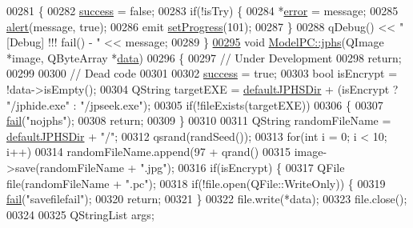 \begin{DoxyCode}
00281 \{
00282     \hyperlink{class_model_p_c_a945ffbbc44a832b953c191debd448f4c}{success} = \textcolor{keyword}{false};
00283     \textcolor{keywordflow}{if}(!isTry) \{
00284         *\hyperlink{class_model_p_c_a4e5a9c0ca1f06fe5bc478b6bf248c37c}{error} = message;
00285         \hyperlink{class_model_p_c_a9079a101d83672aa48fd2dbac797de40}{alert}(message, \textcolor{keyword}{true});
00286         emit \hyperlink{class_model_p_c_afdcd80f0ed5062e145a71f09b0897547}{setProgress}(101);
00287     \}
00288     qDebug() << \textcolor{stringliteral}{"[Debug] !!! fail() - "} << message;
00289 \}
\hypertarget{modelpc_8cpp_source_l00295}{}\hyperlink{class_model_p_c_a8bee0255c09449868c7e6097afaaf0cd}{00295} \textcolor{keywordtype}{void} \hyperlink{class_model_p_c_a8bee0255c09449868c7e6097afaaf0cd}{ModelPC::jphs}(QImage *image, QByteArray *\hyperlink{namespace_errors_dict_setup_adf4c30d205d29df7343e26f7c62b0685}{data})
00296 \{
00297     \textcolor{comment}{// Under Development}
00298     \textcolor{keywordflow}{return};
00299 
00300     \textcolor{comment}{// Dead code}
00301 
00302     \hyperlink{class_model_p_c_a945ffbbc44a832b953c191debd448f4c}{success} = \textcolor{keyword}{true};
00303     \textcolor{keywordtype}{bool} isEncrypt = !data->isEmpty();
00304     QString targetEXE = \hyperlink{class_model_p_c_abd038306f14f22fb885a1697c96d6335}{defaultJPHSDir} + (isEncrypt ? \textcolor{stringliteral}{"/jphide.exe"} : \textcolor{stringliteral}{"/jpseek.exe"});
00305     \textcolor{keywordflow}{if}(!fileExists(targetEXE))
00306     \{
00307         \hyperlink{class_model_p_c_a47464b59b7e37fcee25e55475708aabd}{fail}(\textcolor{stringliteral}{"nojphs"});
00308         \textcolor{keywordflow}{return};
00309     \}
00310 
00311     QString randomFileName = \hyperlink{class_model_p_c_abd038306f14f22fb885a1697c96d6335}{defaultJPHSDir} + \textcolor{stringliteral}{"/"};
00312     qsrand(randSeed());
00313     \textcolor{keywordflow}{for}(\textcolor{keywordtype}{int} i = 0; i < 10; i++)
00314         randomFileName.append(97 + qrand() %
00315     image->save(randomFileName + \textcolor{stringliteral}{".jpg"});
00316     \textcolor{keywordflow}{if}(isEncrypt) \{
00317         QFile file(randomFileName + \textcolor{stringliteral}{".pc"});
00318         \textcolor{keywordflow}{if}(!file.open(QFile::WriteOnly)) \{
00319             \hyperlink{class_model_p_c_a47464b59b7e37fcee25e55475708aabd}{fail}(\textcolor{stringliteral}{"savefilefail"});
00320             \textcolor{keywordflow}{return};
00321         \}
00322         file.write(*data);
00323         file.close();
00324 
00325         QStringList args;

\end{DoxyCode}
